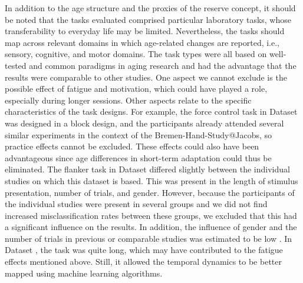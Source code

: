 In addition to the age structure and the proxies of the reserve concept, it should be noted that the tasks evaluated comprised particular laboratory tasks, whose transferability to everyday life may be limited. Nevertheless, the tasks should map across relevant domains in which age-related changes are reported, i.e., sensory, cognitive, and motor domains. The task types were all based on well-tested and common paradigms in aging research and had the advantage that the results were comparable to other studies. One aspect we cannot exclude is the possible effect of fatigue and motivation, which could have played a role, especially during longer sessions. Other aspects relate to the specific characteristics of the task designs. For example, the force control task in Dataset  was designed in a block design, and the participants already attended several similar experiments in the context of the Bremen-Hand-Study@Jacobs, so practice effects cannot be excluded. These effects could also have been advantageous since age differences in short-term adaptation could thus be eliminated. The flanker task in Dataset  differed slightly between the individual studies on which this dataset is based. This was present in the length of stimulus presentation, number of trials, and gender. However, because the participants of the individual studies were present in several groups and we did not find increased misclassification rates between these groups, we excluded that this had a significant influence on the results. In addition, the influence of gender and the number of trials in previous or comparable studies was estimated to be low \cite{Reuter2019, Vahid2020}. In Dataset , the task was quite long, which may have contributed to the fatigue effects mentioned above. Still, it allowed the temporal dynamics to be better mapped using machine learning algorithms.

